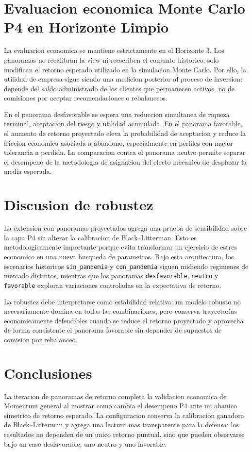 \documentclass[11pt]{article}
\begin{document}
\section{Evaluacion economica Monte Carlo P4 en Horizonte Limpio}
La evaluacion economica se mantiene estrictamente en el Horizonte 3. Los panoramas no recalibran la view ni reescriben el conjunto historico; solo modifican el retorno esperado utilizado en la simulacion Monte Carlo. Por ello, la utilidad de empresa sigue siendo una medicion posterior al proceso de inversion: depende del saldo administrado de los clientes que permanecen activos, no de comisiones por aceptar recomendaciones o rebalanceos.

En el panorama desfavorable se espera una reduccion simultanea de riqueza terminal, aceptacion del riesgo y utilidad acumulada. En el panorama favorable, el aumento de retorno proyectado eleva la probabilidad de aceptacion y reduce la friccion economica asociada a abandono, especialmente en perfiles con mayor tolerancia a perdida. La comparacion contra el panorama neutro permite separar el desempeno de la metodologia de asignacion del efecto mecanico de desplazar la media esperada.

\section{Discusion de robustez}
La extension con panoramas proyectados agrega una prueba de sensibilidad sobre la capa P4 sin alterar la calibracion de Black--Litterman. Esto es metodologicamente importante porque evita transformar un ejercicio de estres economico en una nueva busqueda de parametros. Bajo esta arquitectura, los escenarios historicos \texttt{sin\_pandemia} y \texttt{con\_pandemia} siguen midiendo regimenes de mercado distintos, mientras que los panoramas \texttt{desfavorable}, \texttt{neutro} y \texttt{favorable} exploran variaciones controladas en la expectativa de retorno.

La robustez debe interpretarse como estabilidad relativa: un modelo robusto no necesariamente domina en todas las combinaciones, pero conserva trayectorias economicamente defendibles cuando se reduce el retorno proyectado y aprovecha de forma consistente el panorama favorable sin depender de supuestos de comision por rebalanceo.

\section{Conclusiones}
La iteracion de panoramas de retorno completa la validacion economica de Momentum general al mostrar como cambia el desempeno P4 ante un abanico simetrico de retorno esperado. La configuracion conserva la calibracion ganadora de Black--Litterman y agrega una lectura mas transparente para la defensa: los resultados no dependen de un unico retorno puntual, sino que pueden observarse bajo un caso desfavorable, uno neutro y uno favorable.
\end{document}

